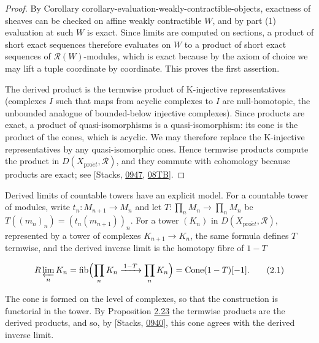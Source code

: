 \documentclass[11pt]{article}
\providecommand{\Cone}{}\renewcommand{\Cone}{\operatorname{Cone}}
\providecommand{\fib}{}\renewcommand{\fib}{\operatorname{fib}}
\begin{document}
\begin{proof}[{Proof}]\label{bp67}%
By Corollary corollary-evaluation-weakly-contractible-objects, exactness of sheaves can be checked on affine weakly contractible \(W\), and by part (1) evaluation at such \(W\) is exact. Since limits are computed on sections, a product of short exact sequences therefore evaluates on \(W\) to a product of short exact sequences of \(\mathcal R(W)\)-modules, which is exact because by the axiom of choice we may lift a tuple coordinate by coordinate. This proves the first assertion.

The derived product is the termwise product of K-injective representatives (complexes \(I\) such that maps from acyclic complexes to \(I\) are null-homotopic, the unbounded analogue of bounded-below injective complexes). Since products are exact, a product of quasi-isomorphisms is a quasi-isomorphism: its cone is the product of the cones, which is acyclic. We may therefore replace the K-injective representatives by any quasi-isomorphic ones. Hence termwise products compute the product in \(D(X_{\mathrm{pro}\acute{e}t},\mathcal R)\), and they commute with cohomology because products are exact; see [Stacks, \href{https://stacks.math.columbia.edu/tag/0947}{0947}, \href{https://stacks.math.columbia.edu/tag/08TB}{08TB}].
\end{proof}

\label{bp68}%
Derived limits of countable towers have an explicit model. For a countable tower of modules, write \(t_n:M_{n+1}\to M_n\) and let \(T:\prod_nM_n\to\prod_nM_n\) be \(T((m_n)_n)=(t_n(m_{n+1}))_n\). For a tower \((K_n)\) in \(D(X_{\mathrm{pro}\acute{e}t},\mathcal R)\), represented by a tower of complexes \(K_{n+1}\to K_n\), the same formula defines \(T\) termwise, and the derived inverse limit is the homotopy fibre of \(1-T\)

\[
R\varprojlim_n K_n
=
\fib\Bigl(
\prod_n K_n\xrightarrow{\,1-T\,}\prod_n K_n
\Bigr)=\Cone(1-T)[-1].
\tag{2.1}
\]

The cone is formed on the level of complexes, so that the construction is functorial in the tower. By Proposition \hyperref[bp66]{2.23} the termwise products are the derived products, and so, by [Stacks, \href{https://stacks.math.columbia.edu/tag/0940}{0940}], this cone agrees with the derived inverse limit.
\end{document}
